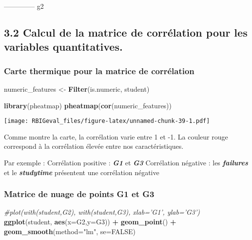 \documentclass[
]{article}
\newenvironment{Shaded}{\begin{snugshade}}{\end{snugshade}}
\newcommand{\CommentTok}[1]{\textcolor[rgb]{0.56,0.35,0.01}{\textit{#1}}}
\newcommand{\DataTypeTok}[1]{\textcolor[rgb]{0.13,0.29,0.53}{#1}}
\newcommand{\KeywordTok}[1]{\textcolor[rgb]{0.13,0.29,0.53}{\textbf{#1}}}
\newcommand{\NormalTok}[1]{#1}
\newcommand{\OperatorTok}[1]{\textcolor[rgb]{0.81,0.36,0.00}{\textbf{#1}}}
\newcommand{\OtherTok}[1]{\textcolor[rgb]{0.56,0.35,0.01}{#1}}
\newcommand{\StringTok}[1]{\textcolor[rgb]{0.31,0.60,0.02}{#1}}
\begin{document}
-------------- g2

\hypertarget{calcul-de-la-matrice-de-corruxe9lation-pour-les-variables-quantitatives.}{%
\subsection{3.2 Calcul de la matrice de corrélation pour les variables
quantitatives.}\label{calcul-de-la-matrice-de-corruxe9lation-pour-les-variables-quantitatives.}}

\hypertarget{carte-thermique-pour-la-matrice-de-corruxe9lation}{%
\subsubsection{Carte thermique pour la matrice de
corrélation}\label{carte-thermique-pour-la-matrice-de-corruxe9lation}}

\begin{Shaded}
\begin{Highlighting}[]
\NormalTok{numeric_features <-}\StringTok{ }\KeywordTok{Filter}\NormalTok{(is.numeric, student)}

\KeywordTok{library}\NormalTok{(pheatmap)}
\KeywordTok{pheatmap}\NormalTok{(}\KeywordTok{cor}\NormalTok{(numeric_features))}
\end{Highlighting}
\end{Shaded}

\texttt{[image: RBIGeval\_files/figure-latex/unnamed-chunk-39-1.pdf]}

Comme montre la carte, la corrélation varie entre 1 et -1. La couleur
rouge correspond à la corrélation élevée entre nos caractéristiques.

Par exemple : Corrélation positive : \textbf{\emph{G1}} et
\textbf{\emph{G3}} Corrélation négative : les \textbf{\emph{failures}}
et le \textbf{\emph{studytime}} présentent une corrélation négative

\hypertarget{matrice-de-nuage-de-points-g1-et-g3}{%
\subsubsection{Matrice de nuage de points G1 et
G3}\label{matrice-de-nuage-de-points-g1-et-g3}}

\begin{Shaded}
\begin{Highlighting}[]
\CommentTok{#plot(with(student,G2), with(student,G3), xlab='G1', ylab='G3')}
\KeywordTok{ggplot}\NormalTok{(student, }\KeywordTok{aes}\NormalTok{(}\DataTypeTok{x=}\NormalTok{G2,}\DataTypeTok{y=}\NormalTok{G3)) }\OperatorTok{+}\StringTok{ }\KeywordTok{geom_point}\NormalTok{() }\OperatorTok{+}\StringTok{ }\KeywordTok{geom_smooth}\NormalTok{(}\DataTypeTok{method=}\StringTok{"lm"}\NormalTok{, }\DataTypeTok{se=}\OtherTok{FALSE}\NormalTok{)}
\end{Highlighting}
\end{Shaded}
\end{document}
